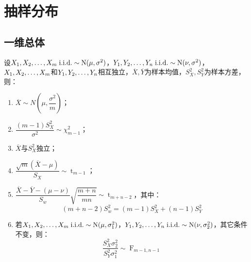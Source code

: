 \section{抽样分布}

\subsection{一维总体}
\begin{theorem}\label{theo:SamplingDist1}
	设$X_1, X_2, \dots, X_{m}\;\text{i.i.d.}\sim \operatorname{N}(\mu,\sigma^2)$，$Y_1, Y_2, \dots, Y_{n}\;\text{i.i.d.}\sim \operatorname{N}(\nu,\sigma^2)$，$X_1, X_2, \dots, X_{m}$和$Y_1, Y_2, \dots, Y_{n}$相互独立，$\overline{X},\overline{Y}$为样本均值，$S_X^2,S_Y^2$为样本方差，则：
	\begin{enumerate}
		\item $\overline{X}\sim N\left(\mu,\dfrac{\sigma^2}{m}\right)$；
		\item $\dfrac{(m-1)S_X^2}{\sigma^2}\sim\chi_{m-1}^2$；
		\item $\overline{X}$与$S_X^2$独立；
		\item $\dfrac{\sqrt{m}(\overline{X}-\mu)}{S_X}\sim \operatorname{t}_{m-1}$；
		\item $\dfrac{\overline{X}-\overline{Y}-(\mu-\nu)}{S_w}\sqrt{\dfrac{m+n}{mn}}\sim \operatorname{t}_{m+n-2}$，其中：
		\begin{equation*}
			(m+n-2)S_w^2=(m-1)S_X^2+(n-1)S_Y^2
		\end{equation*}
		\item 若$X_1, X_2, \dots, X_{m}\;\text{i.i.d.}\sim \operatorname{N}(\mu,\sigma_1^2)$，$Y_1, Y_2, \dots, Y_{n}\;\text{i.i.d.}\sim \operatorname{N}(\nu,\sigma_2^2)$，其它条件不变，则：
		\begin{equation*}
			\frac{S_X^2\sigma_2^2}{S_Y^2\sigma_1^2}\sim \operatorname{F}_{m-1,n-1}
		\end{equation*}
	\end{enumerate}
\end{theorem}
